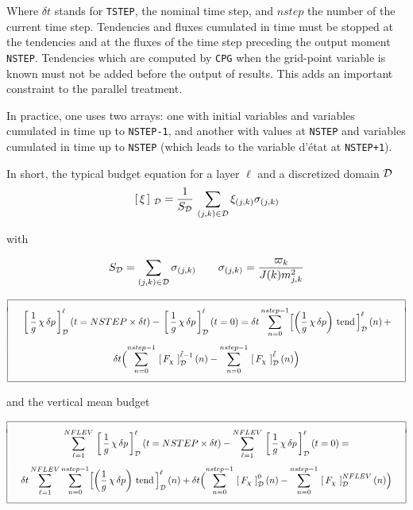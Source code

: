 \noi Where $\delta t$ stands for {\tt TSTEP}, the nominal time step, and $nstep$ the number of the current time step. Tendencies and fluxes cumulated in time must be stopped  at the tendencies and at the fluxes of the time step preceding the output moment {\tt NSTEP}. Tendencies which are computed by {\tt CPG} when the grid-point variable is known must not be added before the output of results. This adds an important constraint to the parallel treatment.

In practice, one uses two arrays: one with initial variables and variables cumulated in time up to {\tt NSTEP-1}, and another with values at {\tt NSTEP} and variables cumulated in time up to {\tt NSTEP} (which leads to the variable d'état at {\tt NSTEP+1}).
 
\bigskip

In short, the typical budget equation for a layer $\ell$ and a discretized domain $\cal D$
$$ \lc \xi \rc_{\cal D} = \frac 1{S_{\cal D}} \,\sum_{(j,k) \in {\cal D}} \xi_{(j,k)} \sigma_{(j,k)} $$

\noi with

$$ S_{\cal D} = \sum_{(j,k) \in {\cal D}} \sigma_{(j,k)} \qquad \sigma_{(j,k)} = \frac{\varpi_k}{J(k) 
m_{j,k}^2} $$

$$ \bay{|c|} \hline \\[-1ex]
\quad \ds \lc \frac 1g \, \chi \,\delta p \rd_{\cal D}^\ell \lp t=NSTEP \times \delta t \rp - \lc \frac 
1g \, \chi \,\delta p \rd_{\cal D}^\ell \lp t=0 \rp = \delta t \sum_{n=0}^{nstep-1} 
\Bigl[ \lp \frac 1g\, \chi\,\delta p \rp \, {\rm tend}\, 
\Bigr]_{\cal D}^\ell \lp n \rp + \quad\\[4ex]
\quad \ds \delta t \Bigl( \sum_{n=0}^{nstep-1} \lc F_\chi\,\rd_{\cal D}^{\tilde\ell-1} \lp n \rp - \sum_{n=0}^{nstep-1} 
\lc F_\chi\,\rd_{\cal D}^{\tilde\ell} \lp n \rp \Bigr) \quad \\[4ex] \hline \eay $$

\noi and the vertical mean budget

$$ \bay{|c|} \hline \\[-1ex]
\quad \ds\sum_{\ell=1}^{NFLEV} \lc \frac 1g \, \chi \,\delta p \rd_{\cal D}^\ell \lp t=NSTEP \times \delta 
t \rp - \sum_{\ell=1}^{NFLEV} \lc \frac 1g \, \chi \,\delta p \rd_{\cal D}^\ell \lp t=0 \rp = \quad \\[4ex]
\quad \ds \delta t \sum_{\ell=1}^{NFLEV} \sum_{n=0}^{nstep-1} 
\Bigl[ \lp \frac 1g\, \chi\,\delta p \rp \, {\rm tend}\,
\Bigr]_{\cal D}^\ell \lp n \rp + \delta t \Bigl( \sum_{n=0}^{nstep-1} \lc F_\chi\,\rd_{\cal D}^0 
\lp n \rp - \sum_{n=0}^{nstep-1} \lc F_\chi\,\rd_{\cal D}^{NFLEV} \lp n \rp \Bigr) \quad \\[4ex] \hline 
\eay $$


